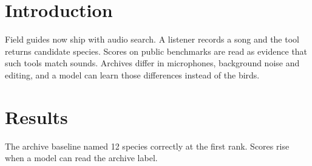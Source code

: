 \begin{abstract}
Song libraries are searched by people who need to name a bird from a field recording. We ask whether retrieval scores on such a library measure matching sounds to species or only matching recordings to the archive they came from. We built a small benchmark of forty recordings and tested three audio models against a baseline that sees only the archive label. One model beat that baseline, and only on a minority of queries.
\end{abstract}
\section{Introduction}
Field guides now ship with audio search. A listener records a song and the tool returns candidate species. Scores on public benchmarks are read as evidence that such tools match sounds. Archives differ in microphones, background noise and editing, and a model can learn those differences instead of the birds.
\section{Results}
The archive baseline named 12 species correctly at the first rank. Scores rise when a model can read the archive label.
